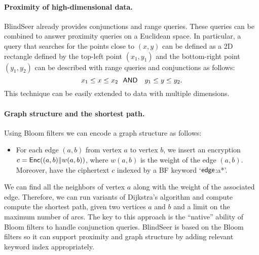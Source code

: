 \paragraph{Proximity of high-dimensional data.}
BlindSeer already provides conjunctions and range queries.  These queries can be combined to answer proximity queries on a Euclidean space.
In particular, a query that searches for the points close to $(x, y)$ can be defined as a 2D rectangle defined by the top-left point $(x_1, y_1)$ and the
bottom-right point $(y_1, y_2)$ can be described with range queries and
conjunctions as follows: $$ x_1 \le x \le x_2 ~~{\sf AND}~~~ y_1 \le y \le y_2.
$$ This technique can be easily extended to data with multiple dimensions. 

\paragraph{Graph structure and the shortest path.}
Using Bloom filters we can encode a graph structure as follows:
\begin{itemize}
\item For each edge $(a, b)$ from vertex $a$ to vertex $b$, we insert an
  encryption $c = \mathsf{Enc}((a,b) \| w(a,b) )$, where $w(a,b)$ is the weight of the edge
    $(a,b)$. Moreover, have the ciphertext $c$ indexed by a BF keyword `$\sf edge$:a*'. 
\end{itemize}

\noindent
We can find all the neighbors of vertex $a$ along with the weight of the
associated edge. Therefore, we can run variants of Dijkstra's algorithm and
compute compute the shortest path, given two vertices $a$ and $b$ and a limit
on the maximum number of arcs. The key to this approach is the ``native''
ability of Bloom filters to handle conjunction queries.  BlindSeer is based on
the Bloom filters so it can support proximity and graph structure by adding
relevant keyword index appropriately.
%


\def\HHH{{\cal H}}

